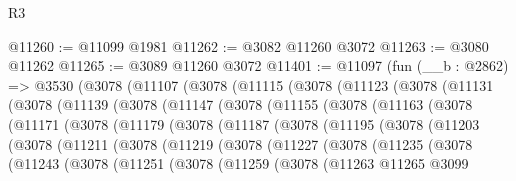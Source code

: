 \begin{lexlean}{R3}
\begin{coremodule}
@11260 := @11099 @1981
@11262 := @3082 @11260 @3072
@11263 := @3080 @11262
@11265 := @3089 @11260 @3072
@11401 := @11097
    (fun (__b : @2862) =>
    @3530
      (@3078
        (@11107
          (@3078
            (@11115
              (@3078
                (@11123
                  (@3078
                    (@11131
                      (@3078
                        (@11139
                          (@3078
                            (@11147
                              (@3078
                                (@11155
                                  (@3078
                                    (@11163
                                      (@3078
                                        (@11171
                                          (@3078
                                            (@11179
                                              (@3078
                                                (@11187
                                                  (@3078
                                                    (@11195
                                                      (@3078
                                                        (@11203
                                                          (@3078
                                                            (@11211
                                                              (@3078
                                                                (@11219
                                                                  (@3078
                                                                    (@11227
                                                                      (@3078
                                                                        (@11235
                                                                          (@3078
                                                                            (@11243
                                                                              (@3078
                                                                                (@11251
                                                                                  (@3078
                                                                                    (@11259
                                                                                      (@3078
                                                                                        (@11263
                                                                                          @11265
                                                                                          @3099

\end{coremodule}
\end{lexlean}
